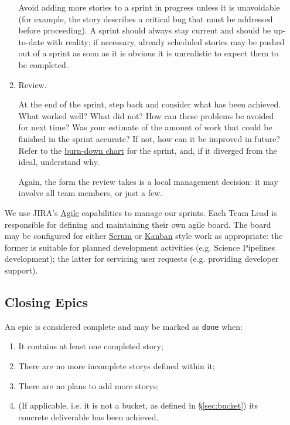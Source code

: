 \begin{itemize}
\begin{enumerate}
  Avoid adding more stories to a sprint in progress unless it is
  unavoidable (for example, the \gls{story} describes a critical bug that must
  be addressed before proceeding). A sprint should always stay current
  and should be up-to-date with reality; if necessary, already scheduled
  stories may be pushed out of a sprint as soon as it is obvious it is
  unrealistic to expect them to be completed.
\item \gls{Review}.

  At the end of the sprint, step back and consider what has been
  achieved. What worked well? What did not? How can these problems be
  avoided for next time? Was your estimate of the amount of work that
  could be finished in the sprint accurate? If not, how can it be
  improved in future? Refer to the
  \href{https://en.wikipedia.org/wiki/Burn_down_chart}{burn-down chart}
  for the sprint, and, if it diverged from the ideal, understand why.

  Again, the form the review takes is a local management decision: it
  may involve all team members, or just a few.
\end{enumerate}

We use \gls{JIRA}'s
\href{https://www.atlassian.com/software/jira/agile}{Agile} capabilities
to manage our sprints. Each Team Lead is responsible for
defining and maintaining their own agile board. The board may be
configured for either
\href{https://en.wikipedia.org/wiki/Scrum_(software_development)}{Scrum}
or \href{https://en.wikipedia.org/wiki/Kanban_(development)}{Kanban}
style work as appropriate: the former is suitable for planned
development activities (e.g. \gls{Science Pipelines} development); the latter
for servicing user requests (e.g. providing developer support).

\subsection{Closing Epics}
\label{sec:epic-close}


An \gls{epic} is considered complete and may be marked as \texttt{done} when:

\begin{enumerate}
\item It contains at least one completed \gls{story};
\item There are no more incomplete \glspl{story} defined within it;
\item There are no plans to add more \glspl{story};
\item (If applicable, i.e. it is not a bucket, as defined in \S\ref{sec:bucket}) its concrete deliverable has been achieved.
\end{enumerate}


\end{itemize}
